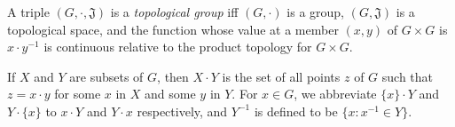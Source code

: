 A triple $(G, \cdot, \mathfrak{J})$ is a \emph{topological group} iff $(G, \cdot)$ is a group, $(G, \mathfrak{J})$ is a topological space, and the function whose value at a member $(x, y)$ of $G \times G$ is $x \cdot y^{-1}$ is continuous relative to the product topology for $G \times G$.

If $X$ and $Y$ are subsets of $G$, then $X \cdot Y$ is the set of all points $z$ of $G$ such that $z = x \cdot y$ for some $x$ in $X$ and some $y$ in $Y$. For $x \in G$, we abbreviate $\{x\} \cdot Y$ and $Y \cdot \{x\}$ to $x \cdot Y$ and $Y \cdot x$ respectively, and $Y^{-1}$ is defined to be $\{x : x^{-1} \in Y\}$.
